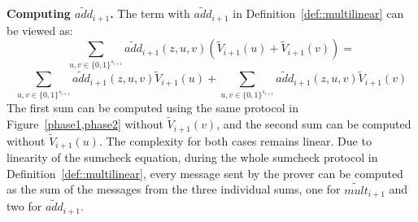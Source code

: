 \smallskip\noindent\textbf{Computing $\tilde{add}_{i+1}$.} The term with $\tilde{add}_{i+1}$ in Definition~\ref{def::multilinear} can be viewed as: 
\[\sum_{u,v\in\{0,1\}^{s_{i+1}}}\tilde{add}_{i+1}(z,u,v)(\tilde{V}_{i+1}(u)+\tilde{V}_{i+1}(v)) =
\]
\[
 \sum_{u,v\in\{0,1\}^{s_{i+1}}}\tilde{add}_{i+1}(z,u,v)\tilde{V}_{i+1}(u)+\sum_{u,v\in\{0,1\}^{s_{i+1}}}\tilde{add}_{i+1}(z,u,v)\tilde{V}_{i+1}(v)
\]
The first sum can be computed using the same protocol in Figure~\ref{phase1,phase2} without $\tilde{V}_{i+1}(v)$, and the second sum can be computed without $\tilde{V}_{i+1}(u)$. The complexity for both cases remains linear. Due to linearity of the sumcheck equation, during the whole sumcheck protocol in Definition~\ref{def::multilinear}, every message sent by the prover can be computed as the sum of the messages from the three individual sums, one for $\tilde{mult}_{i+1}$ and two for $\tilde{add}_{i+1}$. 

